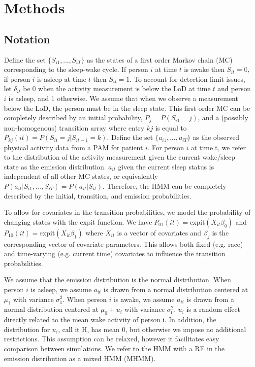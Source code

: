 \documentclass{article}
\begin{document}
\section{Methods} \label{Methods}
\subsection{Notation}

Define the set $\{S_{i1}, ..., S_{iT}\}$ as the states of a first order Markov chain (MC) corresponding to the sleep-wake cycle. If person $i$ at time $t$ is awake then $S_{it}=0$, if person $i$ is asleep at time $t$ then $S_{it}=1$. To account for detection limit issues, let $\delta_{it}$ be 0 when the activity measurement is below the LoD at time $t$ and person $i$ is asleep, and 1 otherwise. We assume that when we observe a measurement below the LoD, the person must be in the sleep state. This first order MC can be completely described by an initial probability, $P_j=P(S_{i1} =j)$, and a (possibly non-homogenous) transition array where entry $kj$ is equal to $P_{kj}(it)=P(S_{it}=j|S_{it-1}=k)$. Define the set $\{a_{i1}, ..., a_{iT}\}$ as the observed physical activity data from a PAM for patient $i$. For person $i$ at time t, we refer to the distribution of the activity measurement given the current wake/sleep state as the emission distribution. $a_{it}$ given the current sleep status is independent of all other MC states, or equivalently $P(a_{it}|S_{i1}, ..., S_{iT}) = P(a_{it}|S_{it})$. Therefore, the HMM can be completely described by the initial, transition, and emission probabilities.

To allow for covariates in the transition probabilities, we model the probability of changing states with the expit function. We have $P_{01}(it) = \text{expit}(X_{it}\beta_0)$ and $P_{10}(it) = \text{expit}(X_{it}\beta_1)$ where $X_{it}$ is a vector of covariates and $\beta_j$ is the corresponding vector of covariate parameters. This allows both fixed (e.g. race) and time-varying (e.g. current time) covariates to influence the transition probabilities.

We assume that the emission distribution is the normal distribution. When person $i$ is asleep, we assume $a_{it}$ is drawn from a normal distribution centered at $\mu_1$ with variance $\sigma_1^2$. When person $i$ is awake, we assume $a_{it}$ is drawn from a normal distribution centered at $\mu_0+u_i$ with variance $\sigma_0^2$. $u_i$ is a random effect directly related to the mean wake activity of person i. In addition, the distribution for $u_i$, call it H, has mean 0, but otherwise we impose no additional restrictions. This assumption can be relaxed, however it facilitates easy comparison between simulations. We refer to the HMM with a RE in the emission distribution as a mixed HMM (MHMM).
\end{document}

